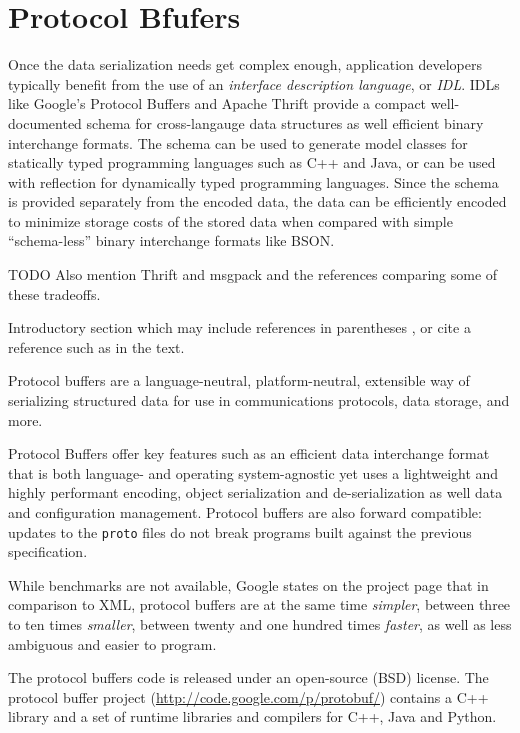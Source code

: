 \section{Protocol Bfufers}

Once the data serialization needs get complex enough, application
developers typically benefit from the use of an \emph{interface
description language}, or \emph{IDL}.  IDLs like Google's Protocol
Buffers and Apache Thrift provide a compact well-documented schema for
cross-langauge data structures as well efficient binary interchange
formats.  The schema can be used to generate model classes for
statically typed programming languages such as C++ and Java, or can be
used with reflection for dynamically typed programming languages.
Since the schema is provided separately from the encoded data, the
data can be efficiently encoded to minimize storage costs of the
stored data when compared with simple ``schema-less'' binary
interchange formats like BSON.



TODO Also mention Thrift and msgpack and the references comparing some
of these tradeoffs.

Introductory section which may include references in parentheses
\citep{R}, or cite a reference such as \citet{R} in the text.

Protocol buffers are a language-neutral, platform-neutral, extensible
way of serializing structured data for use in communications
protocols, data storage, and more.

Protocol Buffers offer key features such as an efficient data interchange
format that is both language- and operating system-agnostic yet uses a
lightweight and highly performant encoding, object serialization and
de-serialization as well data and configuration management. Protocol
buffers are also forward compatible: updates to the \texttt{proto}
files do not break programs built against the previous specification.

While benchmarks are not available, Google states on the project page that in
comparison to XML, protocol buffers are at the same time \textsl{simpler},
between three to ten times \textsl{smaller}, between twenty and one hundred
times \textsl{faster}, as well as less ambiguous and easier to program.

The protocol buffers code is released under an open-source (BSD) license. The
protocol buffer project (\url{http://code.google.com/p/protobuf/})
contains a C++ library and a set of runtime libraries and compilers for
C++, Java and Python.

